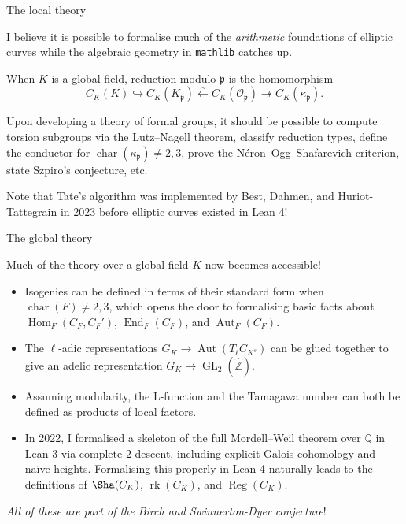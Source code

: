 \documentclass[10pt]{beamer}
\begin{document}
\begin{frame}[t]{The local theory}

I believe it is possible to formalise much of the \emph{arithmetic} foundations of elliptic curves while the algebraic geometry in \texttt{mathlib} catches up.

\vspace{0.5cm} When $ K $ is a global field, reduction modulo $ \mathfrak{p} $ is the homomorphism
$$ C_K(K) \hookrightarrow C_K(K_\mathfrak{p}) \xleftarrow{\sim} C_K(\mathcal{O}_\mathfrak{p}) \twoheadrightarrow C_K(\kappa_\mathfrak{p}). $$

Upon developing a theory of formal groups, it should be possible to compute torsion subgroups via the Lutz--Nagell theorem, classify reduction types, define the conductor for $ \operatorname{char}(\kappa_\mathfrak{p}) \ne 2, 3 $, prove the N\'eron--Ogg--Shafarevich criterion, state Szpiro's conjecture, etc.

\vspace{0.5cm} Note that Tate's algorithm was implemented by Best, Dahmen, and Huriot-Tattegrain in 2023 before elliptic curves existed in Lean 4!

\end{frame}

\begin{frame}[t]{The global theory}

Much of the theory over a global field $ K $ now becomes accessible!
\begin{itemize}
\item Isogenies can be defined in terms of their standard form when $ \operatorname{char}(F) \ne 2, 3 $, which opens the door to formalising basic facts about $ \operatorname{Hom}_F(C_F, C_F') $, $ \operatorname{End}_F(C_F) $, and $ \operatorname{Aut}_F(C_F) $.
\item The $ \ell $-adic representations $ G_K \to \operatorname{Aut}(T_\ell C_{K^s}) $ can be glued together to give an adelic representation $ G_K \to \operatorname{GL}_2(\widehat{\mathbb{Z}}) $.
\item Assuming modularity, the L-function and the Tamagawa number can both be defined as products of local factors.
\item In 2022, I formalised a skeleton of the full Mordell--Weil theorem over $ \mathbb{Q} $ in Lean 3 via complete $ 2 $-descent, including explicit Galois cohomology and na\"ive heights. Formalising this properly in Lean 4 naturally leads to the definitions of $ \Sha(C_K) $, $ \operatorname{rk}(C_K) $, and $ \operatorname{Reg}(C_K) $.
\end{itemize}
\emph{All of these are part of the Birch and Swinnerton-Dyer conjecture}!

\end{frame}
\end{document}

